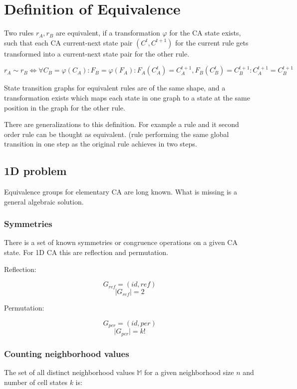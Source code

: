 \documentclass{ijuc}
\begin{document}
\section{Definition of Equivalence}

Two rules \( r_{A}, r_{B} \) are equivalent, if a transformation \(\varphi\) for the CA state exists, such that each CA
current-next state pair \( (C^{t}, C^{t+1}) \) for the current rule gets transformed into a current-next state pair
for the other rule.

\[ r_{A} \sim r_{B}  \Leftrightarrow  \forall C_{B}=\varphi(C_{A}) : F_{B}=\varphi(F_{A}) : F_{A}(C_{A}^{t}) = C_{A}^{t+1}, F_{B}(C_{B}^{t}) = C_{B}^{t+1} : C_{A}^{t+1} = C_{B}^{t+1} \]

State transition graphs for equivalent rules are of the same shape, and a transformation exists
which maps each state in one graph to a state at the same position in the graph for the other rule.

There are generalizations to this definition. For example a rule and it second order rule can be thought as equivalent.
(rule performing the same global transition in one step as the original rule achieves in two steps.

\subsection{1D problem}

Equivalence groups for elementary CA are long known. What is missing is a general algebraic solution.

\subsubsection{Symmetries}

There is a set of known symmetries or congruence operations on a given CA state.
For 1D CA this are reflection and permutation.

Reflection:

\[ G_{ref} = (id, ref) \]
\[ \vert G_{ref} \vert = 2 \]

Permutation:

\[ G_{per} = (id, per) \]
\[ \vert G_{per} \vert = k! \]

\subsubsection{Counting neighborhood values}

The set of all distinct neighborhood values $\mathbb{M}$ for a given neighborhood size $n$ and
number of cell states $k$ is:
\end{document}
